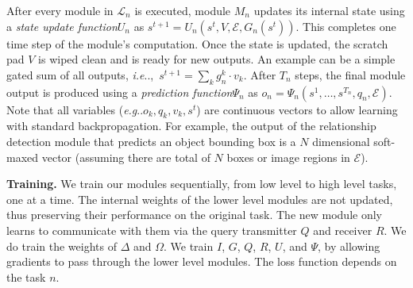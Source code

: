 \documentclass{article}
\makeatletter
\def\E{\mathcal{E}}
\DeclareRobustCommand\onedot{\futurelet\@let@token\@onedot}
\def\@onedot{\ifx\@let@token.\else.\null\fi\xspace}
\def\eg{\emph{e.g}\onedot} \def\Eg{\emph{E.g}\onedot}
\def\ie{\emph{i.e}\onedot} \def\Ie{\emph{I.e}\onedot}
\makeatother
\begin{document}
After every module in $\mathcal L_n$ is executed, module $M_n$ updates its internal state using a \emph{state update function}$U_n$ as $s^{t+1} = U_n(s^t, V, \E, G_n(s^t))$.
This completes one time step of the module's computation.
Once the state is updated, the scratch pad $V$ is wiped clean and is ready for new outputs.
An example can be a simple gated sum of all outputs, \ie,~$s^{t+1} = \sum_k g_n^k\cdot v_k$.
After $T_n$ steps, the final module output is produced using a \emph{prediction function}$\Psi_n$ as $o_n = \Psi_n(s^1, \ldots, s^{T_n}, q_n, \E)$.
Note that all variables (\eg$o_k, q_k, v_k, s^t$) are continuous vectors to allow learning with standard backpropagation.
For example, the output of the relationship detection module that predicts an object bounding box is a $N$ dimensional soft-maxed vector (assuming there are total of $N$ boxes or image regions in $\E$).

\textbf{Training.}\hspace{2mm}
We train our modules sequentially, from low level to high level tasks, one at a time.
The internal weights of the lower level modules are not updated, thus preserving their performance on the original task.
The new module only learns to communicate with them via the query transmitter $Q$ and receiver $R$.
We do train the weights of $\Delta$ and $\Omega$.
We train $I$, $G$, $Q$, $R$, $U$, and $\Psi$, by allowing gradients to pass through the lower level modules.
The loss function depends on the task $n$.
\end{document}
